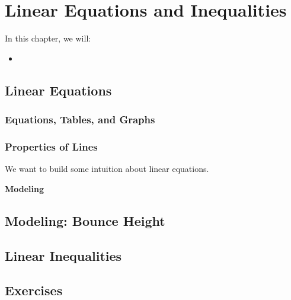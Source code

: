 
\chapter{Linear Equations and Inequalities}

\begin{summary}
In this chapter, we will: 
\begin{itemize}
    \item 
\end{itemize}
\end{summary}

\newpage 

\section{Linear Equations}

\subsection{Equations, Tables, and Graphs}
\subsection{Properties of Lines}
We want to build some intuition about linear equations. 


\newpage 
\begin{center}
	\textbf{Modeling}
\end{center}

\newpage 
\section{Modeling: Bounce Height}

\newpage 
\section{Linear Inequalities}


\newpage 
\section{Exercises} 